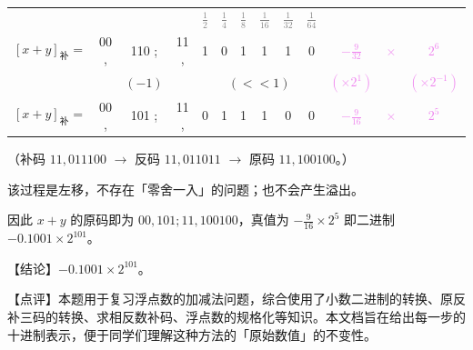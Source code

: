 \documentclass[UTF8]{ctexart}
\newcommand\littleword[1]{\textcolor{gray}{\footnotesize #1}}
\begin{document}
\begin{table}[htb]
  \centering
  \begin{tabular}{cccccccccc|ccc}
  & & & & \littleword{$\frac12$} & \littleword{$\frac14$} & \littleword{$\frac18$} & \littleword{$\frac1{16}$} & \littleword{$\frac1{32}$} & \littleword{$\frac1{64}$} & & &\\
  $[x+y]_{\text{补}}=$ & 00 ,& 110 ;& 11 ,& 1&0&1&1&1&0 & \textcolor{violet}{$-\frac{9}{32}$} & \textcolor{violet}{$\times$} & \textcolor{violet}{$2^6$} \\
  & & $(-1)$ & & \multicolumn{6}{c}{$(<<1)$} & \textcolor{violet}{$(\times 2^1)$} & & \textcolor{violet}{$(\times 2^{-1})$}\\
  $[x+y]_{\text{补}}=$ & 00 ,& 101 ;& 11 ,& 0&1&1&1&0&\textcolor{green!70!black}{0} & \textcolor{violet}{$-\frac{9}{16}$} & \textcolor{violet}{$\times$} & \textcolor{violet}{$2^5$} \\
  \end{tabular}
\end{table}

（补码 $11,011100$ $\to$ 反码 $11,011011$ $\to$ 原码 $11,100100$。）

该过程是左移，不存在「零舍一入」的问题；也不会产生溢出。

因此 $x+y$ 的原码即为 $00,101; 11,100100$，真值为 $-\frac{9}{16}\times 2^5$ 即二进制 $-0.1001\times 2^{101}$。

\vspace{1em}

{\color{cyan!80!black} 【结论】$-0.1001\times 2^{101}$。

【点评】本题用于复习浮点数的加减法问题，综合使用了小数二进制的转换、原反补三码的转换、求相反数补码、浮点数的规格化等知识。本文档旨在给出每一步的十进制表示，便于同学们理解这种方法的「原始数值」的不变性。
}
\end{document}
